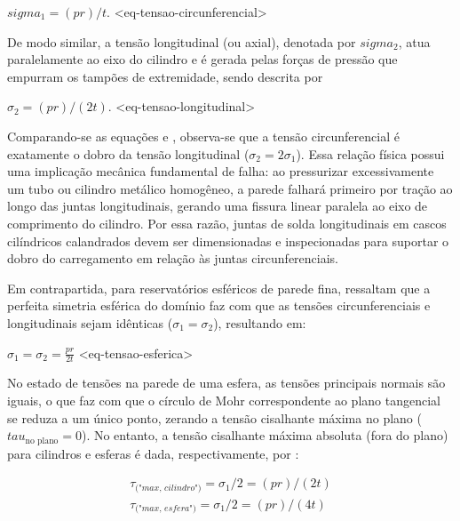 $ sigma_1 = (p r) / t. $ <eq-tensao-circunferencial>

De modo similar, a tensão longitudinal (ou axial), denotada por $sigma_2$, atua paralelamente ao eixo do cilindro e é gerada pelas forças de pressão que empurram os tampões de extremidade, sendo descrita por \cite{beer1989resistencia:}

$ \sigma_2 = (p r) / (2 t). $ <eq-tensao-longitudinal>

Comparando-se as equações \cite{eq-tensao-circunferencial} e \cite{eq-tensao-longitudinal}, observa-se que a tensão circunferencial é exatamente o dobro da tensão longitudinal ($\sigma_2 = 2 \sigma_1$). Essa relação física possui uma implicação mecânica fundamental de falha: ao pressurizar excessivamente um tubo ou cilindro metálico homogêneo, a parede falhará primeiro por tração ao longo das juntas longitudinais, gerando uma fissura linear paralela ao eixo de comprimento do cilindro. Por essa razão, juntas de solda longitudinais em cascos cilíndricos calandrados devem ser dimensionadas e inspecionadas para suportar o dobro do carregamento em relação às juntas circunferenciais. 

Em contrapartida, para reservatórios esféricos de parede fina, \cite[p.~652]{beer1989resistencia} ressaltam que a perfeita simetria esférica do domínio faz com que as tensões circunferenciais e longitudinais sejam idênticas ($\sigma_1 = \sigma_2$), resultando em:

$ \sigma_1 = \sigma_2 = \frac{pr}{2t} $ <eq-tensao-esferica>

No estado de tensões na parede de uma esfera, as tensões principais normais são iguais, o que faz com que o círculo de Mohr correspondente ao plano tangencial se reduza a um único ponto, zerando a tensão cisalhante máxima no plano ($tau_{\text{no plano}} = 0$). No entanto, a tensão cisalhante máxima absoluta (fora do plano) para cilindros e esferas é dada, respectivamente, por \cite[p.~656]{beer1989resistencia}:

\begin{equation}
  \begin{aligned}
    \tau_\textit{("max, cilindro")} = \sigma_1 / 2 = (p r) / (2 t) \\
    \tau_\textit{("max, esfera")} = \sigma_1 / 2 = (p r) / (4 t)
\end{aligned}
\end{equation}

